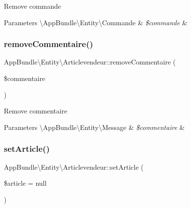Remove commande


\begin{DoxyParams}[1]{Parameters}
\textbackslash{}\+App\+Bundle\textbackslash{}\+Entity\textbackslash{}\+Commande & {\em \$commande} & \\
\hline
\end{DoxyParams}
\mbox{\label{class_app_bundle_1_1_entity_1_1_articlevendeur_a6fa8bff148331a79803a74a74f706e4e}} 
\subsubsection{\texorpdfstring{remove\+Commentaire()}{removeCommentaire()}}
{\footnotesize\ttfamily App\+Bundle\textbackslash{}\+Entity\textbackslash{}\+Articlevendeur\+::remove\+Commentaire (\begin{DoxyParamCaption}\item[{\textbackslash{}\hyperlink{class_app_bundle_1_1_entity_1_1_message}{App\+Bundle\textbackslash{}\+Entity\textbackslash{}\+Message}}]{\$commentaire }\end{DoxyParamCaption})}

Remove commentaire


\begin{DoxyParams}[1]{Parameters}
\textbackslash{}\+App\+Bundle\textbackslash{}\+Entity\textbackslash{}\+Message & {\em \$commentaire} & \\
\hline
\end{DoxyParams}
\mbox{\label{class_app_bundle_1_1_entity_1_1_articlevendeur_ad74dce1b7f90bc69d37086245ce2214c}} 
\subsubsection{\texorpdfstring{set\+Article()}{setArticle()}}
{\footnotesize\ttfamily App\+Bundle\textbackslash{}\+Entity\textbackslash{}\+Articlevendeur\+::set\+Article (\begin{DoxyParamCaption}\item[{\textbackslash{}\hyperlink{class_app_bundle_1_1_entity_1_1_article}{App\+Bundle\textbackslash{}\+Entity\textbackslash{}\+Article}}]{\$article = {\ttfamily null} }\end{DoxyParamCaption})}


